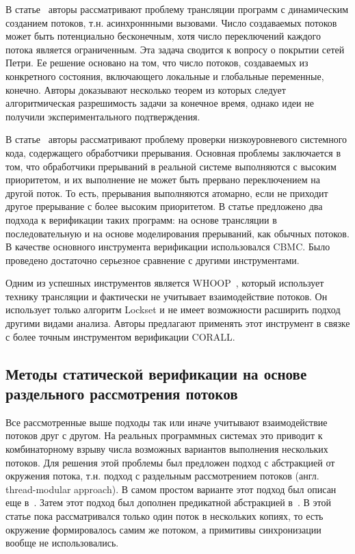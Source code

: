 В статье~\cite{Atig:2009} авторы рассматривают проблему трансляции программ с динамическим созданием потоков, т.н. асинхроннными вызовами.
Число создаваемых потоков может быть потенциально бесконечным, хотя число переключений каждого потока является ограниченным.
Эта задача сводится к вопросу о покрытии сетей Петри. Ее решение основано на том, что число потоков, создаваемых из конкретного состояния, включающего локальные и глобальные переменные, конечно.
Авторы доказывают несколько теорем из которых следует алгоритмическая разрешимость задачи за конечное время, однако идеи не получили экспериментального подтверждения.

В статье~\cite{Liang:2017} авторы рассматривают проблему проверки низкоуровневого системного кода, содержащего обработчики прерывания.
Основная проблемы заключается в том, что обработчики прерываний в реальной системе выполняются с высоким приоритетом, и их выполнение не может быть прервано переключением на другой поток.
То есть, прерывания выполняются атомарно, если не приходит другое прерывание с более высоким приоритетом.
В статье предложено два подхода к верификации таких программ: на основе трансляции в последовательную и на основе моделирования прерываний, как обычных потоков.
В качестве основного инструмента верификации использовался CBMC.
Было проведено достаточно серьезное сравнение с другими инструментами.

Одним из успешных инструментов является WHOOP~\cite{WHOOP}, который использует технику трансляции и фактически не учитывает взаимодействие потоков.
Он использует только алгоритм Lockset и не имеет возможности расширить подход другими видами анализа.
Авторы предлагают применять этот инструмент в связке с более точным инструментом верификации CORALL. 

\subsection{Методы статической верификации на основе раздельного рассмотрения потоков}

Все рассмотренные выше подходы так или иначе учитывают взаимодействие потоков друг с другом. 
На реальных программных системах это приводит к комбинаторному взрыву числа возможных вариантов выполнения нескольких потоков.
Для решения этой проблемы был предложен подход с абстракцией от окружения потока, т.н. подход с раздельным рассмотрением потоков (англ. thread-modular approach). 
В самом простом варианте этот подход был описан еще в~\cite{ThreadModular03}.
Затем этот подход был дополнен предикатной абстракцией в~\cite{Henzinger:2004}.
В этой статье пока рассматривался только один поток в нескольких копиях, то есть окружение формировалось самим же потоком, а примитивы синхронизации вообще не использовались.


